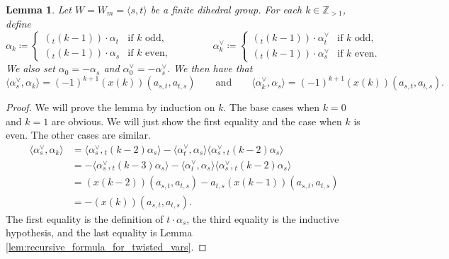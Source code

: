\documentclass{amsart}
\newcommand{\Z}{\mathbb{Z}}
\newtheorem{lemma}[subsubsection]{Lemma}
\theoremstyle{definition}
\numberwithin{equation}{subsection}
\begin{document}
\begin{lemma}\label{lem:twisted_vars_and_pairings}
    Let $W = W_m = \langle s,t \rangle$ be a finite dihedral group.
    For each $k \in \Z_{>1}$, define 
    \[\alpha_k \coloneq \begin{cases} ({}_t (k-1)) \cdot \alpha_t & \text{if } k \text{ odd}, \\ ({}_t (k-1)) \cdot \alpha_s & \text{if } k \text{ even},\end{cases} \qquad\qquad \alpha_k^{\vee} \coloneq \begin{cases} ({}_t (k-1)) \cdot \alpha_t^{\vee} & \text{if } k \text{ odd}, \\ ({}_t (k-1)) \cdot \alpha_s^{\vee} & \text{if } k \text{ even}.\end{cases}\]
    We also set $\alpha_0 = -\alpha_s$ and $\alpha_0^{\vee} = -\alpha_s^{\vee}$.
    We then have that
    \[\langle \alpha_s^{\vee}, \alpha_{k} \rangle = (-1)^{k+1} \left( x(k) \right) (a_{s,t}, a_{t,s}) \qquad\text{and}\qquad \langle \alpha_{k}^{\vee}, \alpha_s  \rangle = (-1)^{k+1} \left( x(k) \right) (a_{s,t}, a_{t,s}).\]
\end{lemma}
\begin{proof}
    We will prove the lemma by induction on $k$.
    The base cases when $k = 0$ and $k=1$ are obvious. We will just show the first equality and the case when $k$ is even. The other cases are similar.
    \begin{align*}
        \langle \alpha_s^{\vee}, \alpha_k \rangle &= \langle \alpha_s^{\vee}, {}_t (k-2) \alpha_s \rangle - \langle \alpha_t^{\vee} ,\alpha_s \rangle \langle \alpha_s^{\vee}, {}_t (k-2) \alpha_s \rangle \\
        &= -\langle \alpha_s^{\vee}, {}_t (k-3) \alpha_s \rangle - \langle \alpha_t^{\vee} ,\alpha_s \rangle \langle \alpha_s^{\vee}, {}_t (k-2) \alpha_s \rangle \\
        &= (x(k-2))(a_{s,t}, a_{t,s}) - a_{t,s} (x(k-1))(a_{s,t}, a_{t,s}) \\
        &= - (x(k)) (a_{s,t}, a_{t,s}).
    \end{align*}
    The first equality is the definition of $t \cdot \alpha_s$, the third equality is the inductive hypothesis, and the last equality is Lemma \ref{lem:recursive_formula_for_twisted_vars}.
\end{proof}
\end{document}
